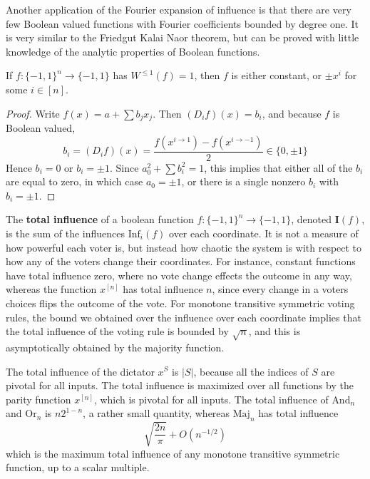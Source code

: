Another application of the Fourier expansion of influence is that there are very few Boolean valued functions with Fourier coefficients bounded by degree one. It is very similar to the Friedgut Kalai Naor theorem, but can be proved with little knowledge of the analytic properties of Boolean functions.

\begin{lemma}
    If $f: \{ -1, 1 \}^n \to \{ -1, 1 \}$ has $W^{\leq 1}(f) = 1$, then $f$ is either constant, or $\pm x^i$ for some $i \in [n]$.
\end{lemma}
\begin{proof}
    Write $f(x) = a + \sum b_j x_j$. Then $(D_i f)(x) = b_i$, and because $f$ is Boolean valued,
    \[ b_i = (D_i f)(x) = \frac{f(x^{i \to 1}) - f(x^{i \to -1})}{2} \in \{ 0, \pm 1 \} \]
    Hence $b_i = 0$ or $b_i = \pm 1$. Since $a_0^2 + \sum b_i^2 = 1$, this implies that either all of the $b_i$ are equal to zero, in which case $a_0 = \pm 1$, or there is a single nonzero $b_i$ with $b_i = \pm 1$.
\end{proof}

The {\bf total influence} of a boolean function $f: \{ -1, 1 \}^n \to \{ -1, 1 \}$, denoted $\mathbf{I}(f)$, is the sum of the influences $\text{Inf}_i(f)$ over each coordinate. It is not a measure of how powerful each voter is, but instead how chaotic the system is with respect to how any of the voters change their coordinates. For instance, constant functions have total influence zero, where no vote change effects the outcome in any way, whereas the function $x^{[n]}$ has total influence $n$, since every change in a voters choices flips the outcome of the vote. For monotone transitive symmetric voting rules, the bound we obtained over the influence over each coordinate implies that the total influence of the voting rule is bounded by $\sqrt{n}$, and this is asymptotically obtained by the majority function.

\begin{example}
    The total influence of the dictator $x^S$ is $|S|$, because all the indices of $S$ are pivotal for all inputs. The total influence is maximized over all functions by the parity function $x^{[n]}$, which is pivotal for all inputs. The total influence of $\text{And}_n$ and $\text{Or}_n$ is $n2^{1-n}$, a rather small quantity, whereas $\text{Maj}_n$ has total influence
    \[ \sqrt{\frac{2n}{\pi}} + O \left( n^{-1/2} \right) \]
    which is the maximum total influence of any monotone transitive symmetric function, up to a scalar multiple.
\end{example}

